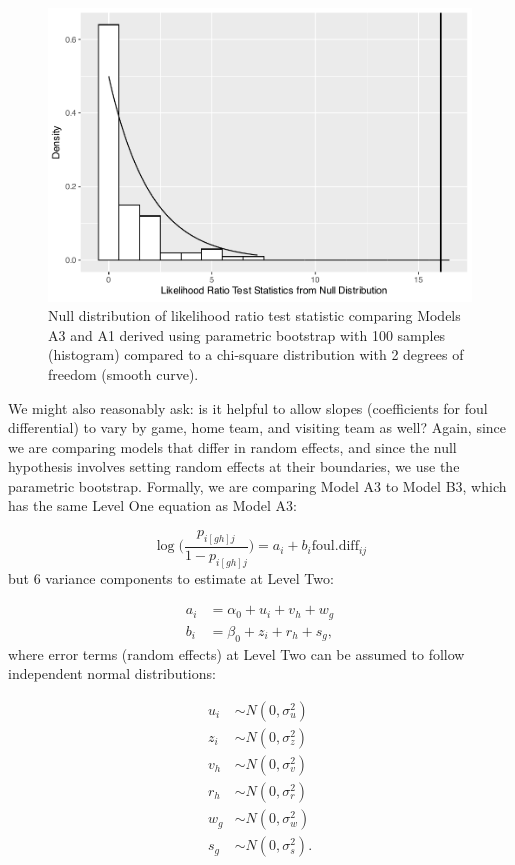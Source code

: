\documentclass[
]{krantz}
\begin{document}
\begin{figure}

{\centering \includegraphics[width=0.6\linewidth]{bookdown-BeyondMLR_files/figure-latex/gmu-lrt1-1} 

}

\caption{Null distribution of likelihood ratio test statistic comparing Models A3 and A1 derived using parametric bootstrap with 100 samples (histogram) compared to a chi-square distribution with 2 degrees of freedom (smooth curve).}\label{fig:gmu-lrt1}
\end{figure}

We might also reasonably ask: is it helpful to allow slopes (coefficients for foul differential) to vary by game, home team, and visiting team as well? Again, since we are comparing models that differ in random effects, and since the null hypothesis involves setting random effects at their boundaries, we use the parametric bootstrap. Formally, we are comparing Model A3 to Model B3, which has the same Level One equation as Model A3:

\[ \log\bigg(\frac{p_{i[gh]j}}{1-p_{i[gh]j}}\bigg)=a_{i}+b_{i}\mathrm{foul.diff}_{ij} \]
but 6 variance components to estimate at Level Two:

\begin{align*}
a_{i} & = \alpha_{0}+u_{i}+v_{h}+w_{g} \\
b_{i} & = \beta_{0}+z_{i}+r_{h}+s_{g},
\end{align*}
where error terms (random effects) at Level Two can be assumed to follow independent normal distributions:

\begin{align*}
u_{i} & \sim N \left( 0 , \sigma_{u}^{2} \right) \\
z_{i} & \sim N \left( 0 , \sigma_{z}^{2} \right) \\
v_{h} & \sim N \left( 0 , \sigma_{v}^{2} \right) \\
r_{h} & \sim N \left( 0 , \sigma_{r}^{2} \right) \\
w_{g} & \sim N \left( 0 , \sigma_{w}^{2} \right) \\
s_{g} & \sim N \left( 0 , \sigma_{s}^{2} \right).
\end{align*}
\end{document}
